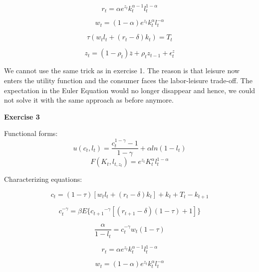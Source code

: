 \documentclass[letterpaper,12pt]{article}
\theoremstyle{definition}
\begin{document}
\begin{equation}
  \label{metric}
  r_t=\alpha e^{z_t}k_t^{\alpha-1} l_t^{1-\alpha}
\end{equation}

\begin{equation}
  w_t=(1-\alpha)e^{z_t}k_t^{\alpha}l_t^{-\alpha}
\end{equation}

\begin{equation}
  \tau(w_tl_t+(r_t-\delta)k_t) = T_t
\end{equation}

\begin{equation}
  \label{metric}
  z_t=(1-\rho_t) \overline{z} +\rho_t z_{t-1} +\epsilon^z_t
\end{equation}

We cannot use the same trick as in exercise 1. The reason is that leisure now enters the utility function and the consumer faces the labor-leisure trade-off. The expectation in the Euler Equation would no longer disappear and hence, we could not solve it with the same approach as before anymore.

\vspace{3mm}

\noindent\textbf{Exercise 3}

Functional forms:
$$u(c_{t}, l_{t})=\frac{c_t^{1-\gamma}-1}{1-\gamma}+\alpha ln(1-l_t)$$
$$F(K_{t}, l_{t, z_{t}})=e^{z_{t}} K_{t}^{\alpha} l_{t}^{1-\alpha}$$

Characterizing equations:

\begin{equation}
  c_{t}=(1-\tau)[w_{t} l_{t}+(r_{t}-\delta)k_{t}]+k_{t}+T_{t}-k_{t+1}
\end{equation}

\begin{equation}
  c_t^{-\gamma}=\beta E\{{c_{t+1}}^{-\gamma} [(r_{t+1}-\delta)(1-\tau)+1]\}
\end{equation}

\begin{equation}
  \frac{\alpha}{1-l_t}=c_t^{-\gamma} w_t(1-\tau)
\end{equation}

\begin{equation}
  r_t=\alpha e^{z_t}k_t^{\alpha-1} l_t^{1-\alpha}
\end{equation}

\begin{equation}
  w_t=(1-\alpha)e^{z_t}k_t^{\alpha}l_t^{-\alpha}
\end{equation}
\end{document}
